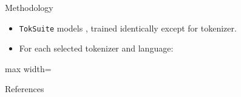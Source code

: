 \documentclass{beamer}
\begin{document}
\begin{frame}{Methodology}
\begin{itemize}
\item  \texttt{TokSuite} models \parencite{altintas2025}, trained identically except for tokenizer.
\item For each selected tokenizer and language:
\end{itemize}
\begin{adjustbox}{max width=\textwidth}

\end{adjustbox}
\end{frame}

\begin{frame}[allowframebreaks]{References}
\printbibliography
\end{frame}
\end{document}
